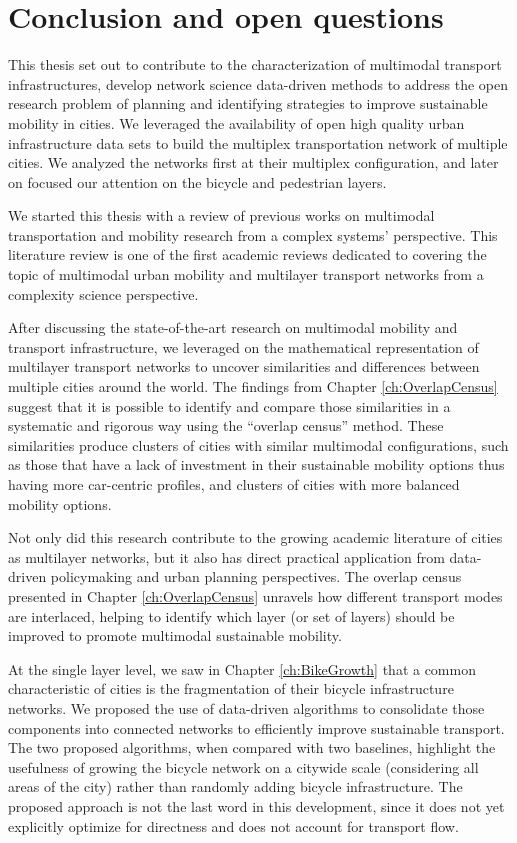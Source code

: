 \chapter{Conclusion and open questions}\label{ch:Conclusion}

This thesis set out to contribute to the characterization of multimodal transport infrastructures, develop network science data-driven methods to address the open research problem of planning and identifying strategies to improve sustainable mobility in cities. We leveraged the availability of open high quality urban infrastructure data sets to build the multiplex transportation network of multiple cities. We analyzed the networks first at their multiplex configuration, and later on focused our attention on the bicycle and pedestrian layers.

We started this thesis with a review of previous works on multimodal transportation and mobility research from a complex systems' perspective. This literature review is one of the first academic reviews dedicated to covering the topic of multimodal urban mobility and multilayer transport networks from a complexity science perspective.

After discussing the state-of-the-art research on multimodal mobility and transport infrastructure, we leveraged on the mathematical representation of multilayer transport networks to uncover similarities and differences between multiple cities around the world. The findings from Chapter \ref{ch:OverlapCensus} suggest that it is possible to identify and compare those similarities in a systematic and rigorous way using the ``overlap census'' method. These similarities produce clusters of cities with similar multimodal configurations, such as those that have a lack of investment in their sustainable mobility options thus having more car-centric profiles, and clusters of cities with more balanced mobility options.

Not only did this research contribute to the growing academic literature of cities as multilayer networks, but it also has direct practical application from data-driven policymaking and urban planning perspectives. The overlap census presented in Chapter \ref{ch:OverlapCensus} unravels how different transport modes are interlaced, helping to identify which layer (or set of layers) should be improved to promote multimodal sustainable mobility.

At the single layer level, we saw in Chapter \ref{ch:BikeGrowth} that a common characteristic of cities is the fragmentation of their bicycle infrastructure networks. We proposed the use of data-driven algorithms to consolidate those components into connected networks to efficiently improve sustainable transport. The two proposed algorithms, when compared with two baselines, highlight the usefulness of growing the bicycle network on a citywide scale (considering all areas of the city) rather than randomly adding bicycle infrastructure. The proposed approach is not the last word in this development, since it does not yet explicitly optimize for directness and does not account for transport flow. 

